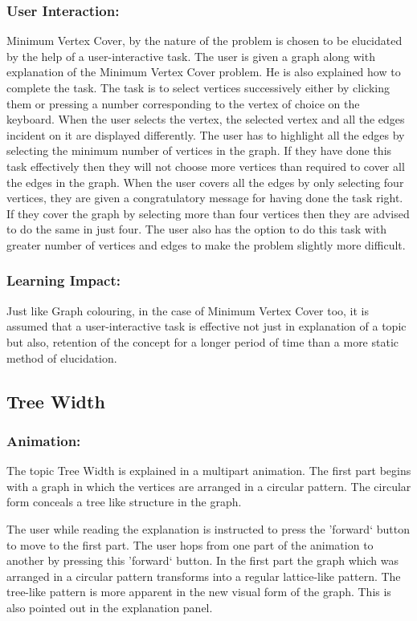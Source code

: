 \subsubsection{User Interaction:}
Minimum Vertex Cover, by the nature of the problem is chosen to be
elucidated by the help of a user-interactive task. The user is given a graph
along with explanation of the Minimum Vertex Cover problem. He is also explained
how to complete the task. The task is to select vertices successively either by
clicking them or pressing a number corresponding to the vertex of choice on the
keyboard.  When the user selects the vertex, the selected vertex and all the edges
incident on it are displayed differently. The user has to highlight all the
edges by selecting the minimum number of vertices in the graph.  If they have done
this task effectively then they will not choose more vertices than required to
cover all the edges in the graph. When the user covers all the edges by only
selecting four vertices, they are given a congratulatory message for having done
the task right. If they cover the graph by selecting more than four vertices
then they are advised to do the same in just four. The user also has the option to do this task with greater
number of vertices and edges to make the problem slightly more difficult.

\subsubsection{Learning Impact:}
Just like Graph colouring, in the case of Minimum Vertex Cover too, it is
assumed that a user-interactive task is effective not just in explanation of a
topic but also, retention of the concept for a longer period of time than a more static method of elucidation.

\subsection{Tree Width}
\subsubsection{Animation:}
The topic Tree Width is explained in a multipart animation. The first part
begins with a graph in which the vertices are arranged in a circular pattern.
The circular form conceals a tree like structure in the graph. 

The user while reading the explanation is instructed to press the 'forward`
button to move to the first part. The user hops from one part of the animation
to another by pressing this 'forward` button.  In the first part the graph
which was arranged in a circular pattern transforms into a regular
lattice-like pattern. The tree-like pattern is more apparent in the new visual
form of the graph.  This is also pointed out in the explanation panel.  

